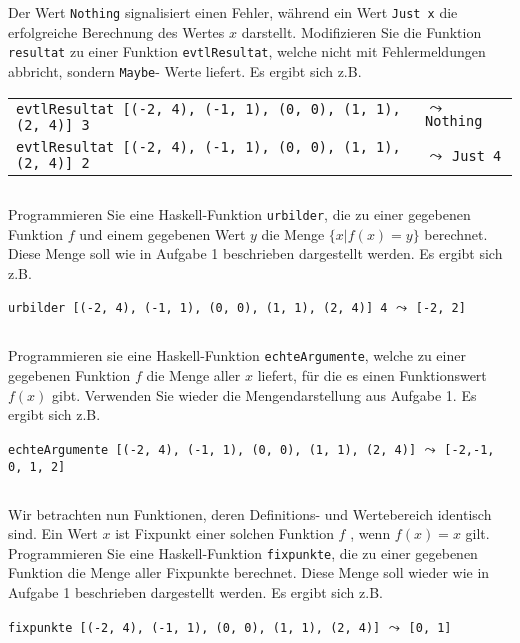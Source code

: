 \documentclass[
  10pt,                   %
  DIV12,
  german,                 %
  oneside,                %
  parskip=half,           %
  headings=normal,        %
  captions=tableheading,  %
]{scrartcl}
\begin{document}
Der Wert \lstinline|Nothing| signalisiert einen Fehler, während ein Wert \lstinline|Just x| die erfolgreiche
Berechnung des Wertes $x$ darstellt. Modifizieren Sie die Funktion \lstinline|resultat| zu einer
Funktion \lstinline|evtlResultat|, welche nicht mit Fehlermeldungen abbricht, sondern \lstinline|Maybe|-
Werte liefert. Es ergibt sich z.B.
\begin{center}
\begin{tabular}{ll}
\lstinline|evtlResultat [(-2, 4), (-1, 1), (0, 0), (1, 1), (2, 4)] 3| & $\leadsto$ \lstinline|Nothing|\\
\lstinline|evtlResultat [(-2, 4), (-1, 1), (0, 0), (1, 1), (2, 4)] 2| & $\leadsto$ \lstinline|Just 4|
\end{tabular}
\end{center}
\subsection{}
Programmieren Sie eine Haskell-Funktion \lstinline|urbilder|, die zu einer gegebenen Funktion
$f$ und einem gegebenen Wert $y$ die Menge $\{x | f(x) = y\}$ berechnet. Diese Menge
soll wie in Aufgabe 1 beschrieben dargestellt werden. Es ergibt sich z.B.
\begin{center}
\lstinline|urbilder [(-2, 4), (-1, 1), (0, 0), (1, 1), (2, 4)] 4| $\leadsto$ \lstinline|[-2, 2]| 
\end{center}
\subsection{}
Programmieren sie eine Haskell-Funktion \lstinline|echteArgumente|, welche zu einer gegebenen
Funktion $f$ die Menge aller $x$ liefert, für die es einen Funktionswert $f(x)$ gibt.
Verwenden Sie wieder die Mengendarstellung aus Aufgabe 1. Es ergibt sich z.B.
\begin{center}
\lstinline|echteArgumente [(-2, 4), (-1, 1), (0, 0), (1, 1), (2, 4)]| $\leadsto$ \lstinline|[-2,-1, 0, 1, 2]|
\end{center}
\subsection{}
Wir betrachten nun Funktionen, deren Definitions- und Wertebereich identisch sind.
Ein Wert $x$ ist Fixpunkt einer solchen Funktion $f$ , wenn $f(x) = x$ gilt. Programmieren
Sie eine Haskell-Funktion \lstinline|fixpunkte|, die zu einer gegebenen Funktion die Menge
aller Fixpunkte berechnet. Diese Menge soll wieder wie in Aufgabe 1 beschrieben
dargestellt werden. Es ergibt sich z.B.
\begin{center}
\lstinline|fixpunkte [(-2, 4), (-1, 1), (0, 0), (1, 1), (2, 4)]| $\leadsto$ \lstinline|[0, 1]|
\end{center}
\end{document}

